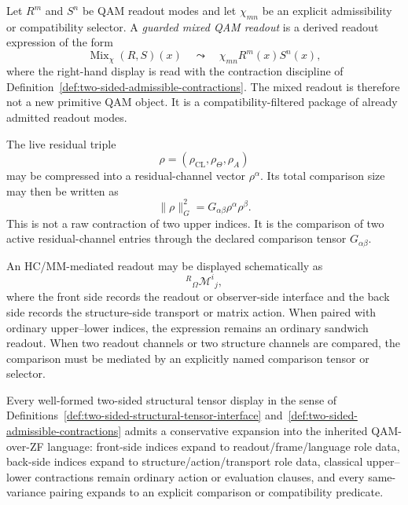 \begin{definition}\label{def:guarded-two-sided-mixed-qam-readout}
Let \(R^m\) and \(S^n\) be QAM readout modes and let \(\chi_{mn}\) be an explicit admissibility or compatibility selector.  A \emph{guarded mixed QAM readout} is a derived readout expression of the form
\[
\operatorname{Mix}_{\chi}(R,S)(x)
\quad\leadsto\quad
\chi_{mn}R^m(x)S^n(x),
\]
where the right-hand display is read with the contraction discipline of Definition~\ref{def:two-sided-admissible-contractions}.  The mixed readout is therefore not a new primitive QAM object.  It is a compatibility-filtered package of already admitted readout modes.
\end{definition}

\begin{remark}\label{ex:two-sided-residual-comparison}
The live residual triple
\[
\rho=(\rho_{\mathrm{CL}},\rho_{\Theta},\rho_A)
\]
may be compressed into a residual-channel vector \(\rho^\alpha\).  Its total comparison size may then be written as
\[
\|\rho\|_G^2=G_{\alpha\beta}\rho^\alpha\rho^\beta .
\]
This is not a raw contraction of two upper indices.  It is the comparison of two active residual-channel entries through the declared comparison tensor \(G_{\alpha\beta}\).
\end{remark}

\begin{remark}\label{ex:two-sided-hc-mm-sandwich}
An HC/MM-mediated readout may be displayed schematically as
\[
{}^{R}{}_{\Omega}\mathcal{M}^{i}{}_{j},
\]
where the front side records the readout or observer-side interface and the back side records the structure-side transport or matrix action.  When paired with ordinary upper--lower indices, the expression remains an ordinary sandwich readout.  When two readout channels or two structure channels are compared, the comparison must be mediated by an explicitly named comparison tensor or selector.
\end{remark}

\begin{proposition}\label{prop:two-sided-conservative-expansion}
Every well-formed two-sided structural tensor display in the sense of Definitions~\ref{def:two-sided-structural-tensor-interface} and~\ref{def:two-sided-admissible-contractions} admits a conservative expansion into the inherited QAM-over-ZF language: front-side indices expand to readout/frame/language role data, back-side indices expand to structure/action/transport role data, classical upper--lower contractions remain ordinary action or evaluation clauses, and every same-variance pairing expands to an explicit comparison or compatibility predicate.
\end{proposition}

